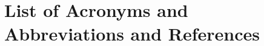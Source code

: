 \documentclass[letter]{ar-1col_WFIRST-HLS}
\begin{document}
\section*{List of Acronyms and Abbreviations and References}
\label{sec:acronyms}


\clearpage
\newpage


%



\clearpage
\newpage
\end{document}
